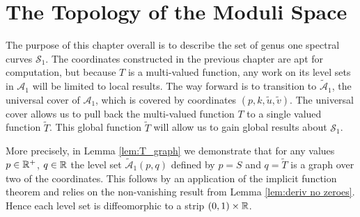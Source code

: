 























\section{The Topology of the Moduli Space}
\label{sec:Topology}

The purpose of this chapter overall is to describe the set of genus one spectral curves $\mathcal{S}_1$. The coordinates constructed in the previous chapter are apt for computation, but because $T$ is a multi-valued function, any work on its level sets in $\mathcal{A}_1$ will be limited to local results. The way forward is to transition to $\mathcal{\tilde{A}}_1$, the universal cover of $\mathcal{A}_1$, which is covered by coordinates $(p,k,\tilde{u},\tilde{v})$. The universal cover allows us to pull back the multi-valued function $T$ to a single valued function $\tilde{T}$. This global function $\tilde{T}$ will allow us to gain global results about $\mathcal{S}_1$.

More precisely,
in Lemma \ref{lem:T_graph} we demonstrate that for any values $p \in \R^+$, $q\in\R$ the level set $\mathcal{\tilde{A}}_1(p,q)$ defined by $p = S$ and $q = \tilde{T}$ is a graph over two of the coordinates. This follows by an application of the implicit function theorem and relies on the non-vanishing result from Lemma \ref{lem:deriv no zeroes}. Hence each level set is diffeomorphic to a strip $(0,1)\times\R$.

